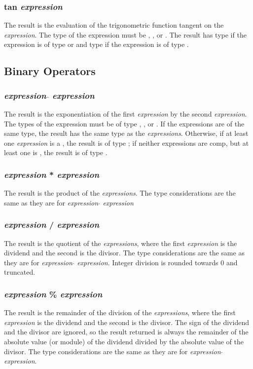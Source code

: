 \subsubsection{tan \textit{expression}}
The result is the evaluation of the trigonometric function tangent on the \textit{expression}. The type of the expression must be \integ, \float, or  \complex. The result has type \float if the expression is of type \integ or \float and type \complex if the expression is of type  \complex. 
\subsection{Binary Operators}
\subsubsection{\textit{expression} $\hat{}$ \textit{expression}}
The result is the exponentiation of the first \textit{expression} by the second \textit{expression}. The types of the expression must be of type \integ, \float, or  \complex. If the expressions are of the same type, the result has the same type as the \textit{expressions}. Otherwise, if at least one \textit{expression} is a \complex, the result is of type \complex; if neither expressions are comp, but at least one is \float, the result is of type \float.
\subsubsection{\textit{expression} * \textit{expression}}
The result is the product of the \textit{expressions}. The type considerations are the same as they are for \textit{expression} $\hat{}$ \textit{expression}
\subsubsection{\textit{expression} / \textit{expression}}
The result is the quotient of the \textit{expressions}, where the first \textit{expression} is the dividend and the second is the divisor. The type considerations are the same as they are for \textit{expression} $\hat{}$ \textit{expression}. Integer division is rounded towards 0 and truncated. 
\subsubsection{\textit{expression} \% \textit{expression}}
The result is the remainder of the division of the \textit{expressions}, where the first \textit{expression} is the dividend and the second is the divisor. The sign of the dividend and the divisor are ignored, so the result returned is always the remainder of the absolute value (or module) of the dividend divided by the absolute value of the divisor. The type considerations are the same as they are for \textit{expression} $\hat{}$ \textit{expression}.
